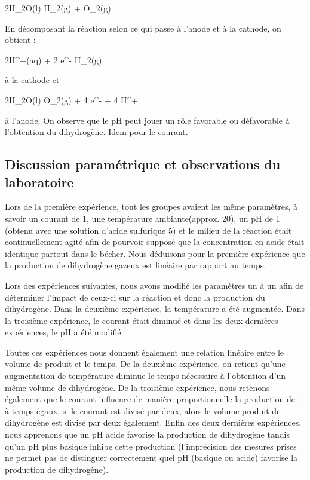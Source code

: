 \begin{chemmath}
	2H_2O(l)  H_2(g) + O_2(g)
\end{chemmath}

En décomposant la réaction selon ce qui passe à l'anode et à la cathode,
on obtient :

\begin{chemmath}
	2H^+(aq) + 2 e^- \rightleftharpoons H_2(g)
\end{chemmath}

à la cathode et

\begin{chemmath}
	2H_2O(l) \rightleftharpoons O_2(g) + 4 e^- + 4 H^+
\end{chemmath}

à l'anode. On observe que le pH peut jouer un rôle favorable ou
défavorable à l'obtention du dihydrogène. Idem pour le courant.

\subsection{Discussion paramétrique et observations du laboratoire}
Lors de la première expérience, tout les groupes avaient les même paramètres,
à savoir un courant de \unit{1}{\ampere}, une température ambiante(approx. \unit{20}{\celsius}),
un pH de 1 (obtenu avec une solution d'acide sulfurique \unit{5}{\mole\per\liter}) et le milieu de
la réaction était continuellement agité afin de pourvoir supposé que la
concentration en acide était identique partout dans le bécher. Nous déduisons
pour la première expérience que la production de dihydrogène gazeux est linéaire
par rapport au temps.

Lors des expériences suivantes, nous avons modifié les paramètres un à
un afin de déterminer l'impact de ceux-ci sur la réaction et donc la
production du dihydrogène. Dans la deuxième expérience, la température
a été augmentée. Dans la troisième expérience, le courant était diminué
et dans les deux dernières expériences, le pH a été modifié.

Toutes ces expériences nous donnent également une relation linéaire
entre le volume de  produit et le temps. De la deuxième expérience,
on retient qu'une augmentation de température diminue le temps nécessaire
à l'obtention d'un même volume de dihydrogène. De la troisième expérience,
nous retenons également que le courant influence de manière proportionnelle
la production de  : à temps égaux, si le courant est divisé par deux,
alors le volume produit de dihydrogène est divisé par deux également. Enfin
des deux dernières expériences, nous apprenons que un pH acide favorise la
production de dihydrogène tandis qu'un pH plus basique inhibe cette
production (l'imprécision des mesures prises ne permet pas de distinguer
correctement quel pH (basique ou acide) favorise la production de dihydrogène).

